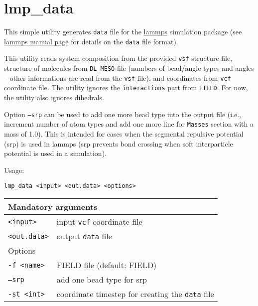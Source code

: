 \section{lmp\_data} \label{sec:lmp_data}

This simple utility generates \texttt{data} file for the
\href{https://lammps.sandia.gov/}{lammps} simulation package (see
\href{https://lammps.sandia.gov/doc/read_data.html}{lammps manual page} for
details on the \texttt{data} file format).

This utility reads system composition from the provided \texttt{vsf}
structure file, structure of molecules  from \texttt{DL\_MESO} file
(numbers of bead/angle types and angles -- other informations are read from
the \texttt{vsf} file), and coordinates from \texttt{vcf} coordinate file.
The utility ignores the \texttt{interactions} part from \texttt{FIELD}. For
now, the utility also ignores dihedrals.

Option \texttt{--srp} can be used to add one more bead type into the output
file (i.e., increment number of atom types and add one more line for
\texttt{Masses} section with a mass of 1.0). This is intended for cases
when the segmental repulsive potential (srp) is used in lammps (srp
prevents bond crossing when soft interparticle potential is used in a
simulation).

Usage:

\vspace{1em}
\noindent
\texttt{lmp\_data <input> <out.data> <options>}

\noindent
\begin{longtable}{p{}p{}}
  \toprule
  \multicolumn{2}{l}{Mandatory arguments} \\
  \midrule
  \texttt{<input>} & input \texttt{vcf} coordinate file \\
  \texttt{<out.data>} & output \texttt{data} file \\
  \toprule
  \multicolumn{2}{l}{Options} \\
  \midrule
  \texttt{-f <name>} & FIELD file (default: FIELD)\\
  \texttt{--srp} & add one bead type for srp\\
  \texttt{-st <int>} & coordinate timestep for creating the \texttt{data}
  file \\
  \bottomrule
\end{longtable}
